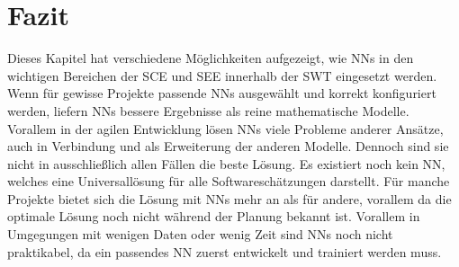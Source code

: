 \section{Fazit}
Dieses Kapitel hat verschiedene Möglichkeiten aufgezeigt, wie NNs in den wichtigen Bereichen der SCE und SEE innerhalb der SWT eingesetzt werden. Wenn für gewisse Projekte passende NNs ausgewählt und korrekt konfiguriert werden, liefern NNs bessere Ergebnisse als reine mathematische Modelle. Vorallem in der agilen Entwicklung lösen NNs viele Probleme anderer Ansätze, auch in Verbindung und als Erweiterung der anderen Modelle.
Dennoch sind sie nicht in ausschließlich allen Fällen die beste Lösung. Es existiert noch kein NN, welches eine Universallösung für alle Softwareschätzungen darstellt. Für manche Projekte bietet sich die Lösung mit NNs mehr an als für andere, vorallem da die optimale Lösung noch nicht während der Planung bekannt ist. Vorallem in Umgegungen mit wenigen Daten oder wenig Zeit sind NNs noch nicht praktikabel, da ein passendes NN zuerst entwickelt und trainiert werden muss.